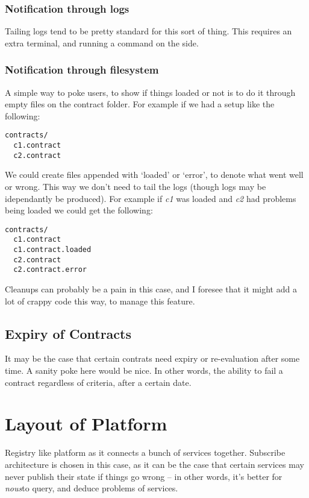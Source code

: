 \documentclass[12pt,twoside]{article}
\newcommand{\projectname}[0]{\textit{nous}}
\begin{document}
\subsubsection{Notification through logs}
Tailing logs tend to be pretty standard for this sort of thing. This
requires an extra terminal, and running a command on the side.

\subsubsection{Notification through filesystem}
A simple way to poke users, to show if things loaded or not is to do
it through empty files on the contract folder. For example if we had a
setup like the following:

\begin{verbatim}
contracts/
  c1.contract
  c2.contract
\end{verbatim}

We could create files appended with `loaded' or `error', to denote
what went well or wrong. This way we don't need to tail the logs
(though logs may be idependantly be produced). For example if
\textit{c1} was loaded and \textit{c2} had problems being loaded we
could get the following:

\begin{verbatim}
contracts/
  c1.contract
  c1.contract.loaded
  c2.contract
  c2.contract.error
\end{verbatim}

Cleanups can probably be a pain in this case, and I foresee that it
might add a lot of crappy code this way, to manage this feature.

\subsection{Expiry of Contracts}
It may be the case that certain contrats need expiry or re-evaluation
after some time. A sanity poke here would be nice. In other words, the
ability to fail a contract regardless of criteria, after a certain
date.

\section{Layout of Platform}
Registry like platform as it connects a bunch of services
together. Subscribe architecture is chosen in this case, as it can be
the case that certain services may never publish their state if things
go wrong -- in other words, it's better for \projectname to query, and
deduce problems of services.
\end{document}

